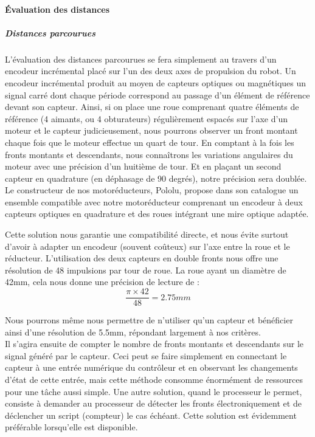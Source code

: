 		\paragraph{Évaluation des distances}

			\subparagraph*{Distances parcourues}

				L'évaluation des distances parcourues se fera simplement au travers d'un encodeur incrémental placé sur l'un des deux axes de propulsion du robot. Un encodeur incrémental produit au moyen de capteurs optiques ou magnétiques un signal carré dont chaque période correspond au passage d'un élément de référence devant son capteur.
				Ainsi, si on place une roue comprenant quatre éléments de référence (4 aimants, ou 4 obturateurs) régulièrement espacés sur l'axe d'un moteur et le capteur judicieusement, nous pourrons observer un front montant chaque fois que le moteur effectue un quart de tour. En comptant à la fois les fronts montants et descendants, nous connaîtrons les variations angulaires du moteur avec une précision d'un huitième de tour. Et en plaçant un second capteur en quadrature (en déphasage de 90 degrés), notre précision sera doublée.\\

				Le constructeur de nos motoréducteurs, Pololu, propose dans son catalogue un ensemble compatible avec notre motoréducteur comprenant un encodeur à deux capteurs optiques en quadrature et des roues intégrant une mire optique adaptée.


				Cette solution nous garantie une compatibilité directe, et nous évite surtout d'avoir à adapter un encodeur (souvent coûteux) sur l'axe entre la roue et le réducteur. L'utilisation des deux capteurs en double fronts nous offre une résolution de 48 impulsions par tour de roue. La roue ayant un diamètre de 42mm, cela nous donne une précision de lecture de :
				\[\frac{\pi \times 42}{48}=2.75mm\]

				Nous pourrons même nous permettre de n'utiliser qu'un capteur et bénéficier ainsi d'une résolution de 5.5mm, répondant largement à nos critères.\\

				Il s'agira ensuite de compter le nombre de fronts montants et descendants sur le signal généré par le capteur.
				Ceci peut se faire simplement en connectant le capteur à une entrée numérique du contrôleur et en observant les changements d'état de cette entrée, mais cette méthode consomme énormément de ressources pour une tâche aussi simple. Une autre solution, quand le processeur le permet, consiste à demander au processeur de détecter les fronts électroniquement et de déclencher un script (compteur) le cas échéant. Cette solution est évidemment préférable lorsqu'elle est disponible.\\

